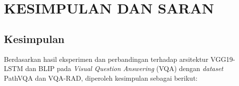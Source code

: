 \chapter{KESIMPULAN DAN SARAN}

\section{Kesimpulan}

\par Berdasarkan hasil eksperimen dan perbandingan terhadap arsitektur VGG19-LSTM dan BLIP pada \textit{Visual Question Answering} (VQA) dengan \textit{dataset} PathVQA dan VQA-RAD, diperoleh kesimpulan sebagai berikut:

